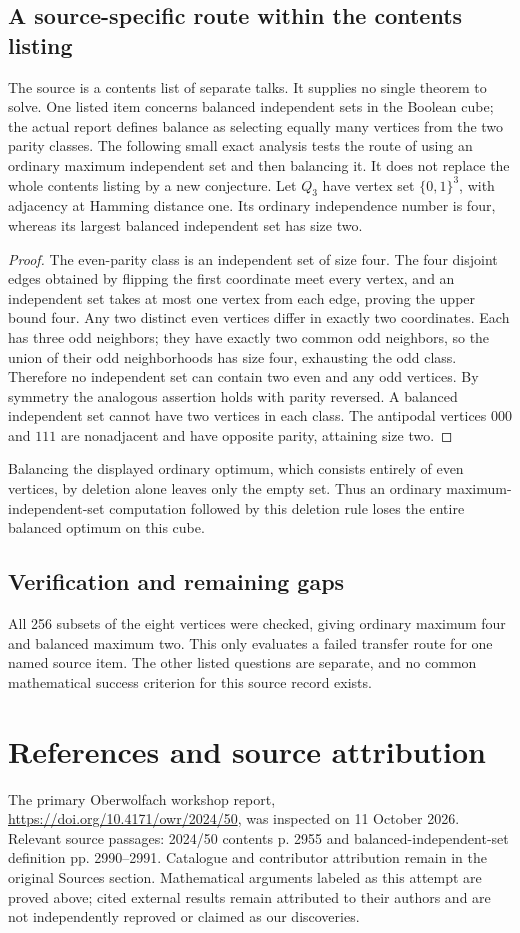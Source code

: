 \documentclass[11pt]{article}
\begin{document}
\subsection{A source-specific route within the contents listing}
The source is a contents list of separate talks. It supplies no single theorem to solve. One listed item concerns balanced independent sets in the Boolean cube; the actual report defines balance as selecting equally many vertices from the two parity classes. The following small exact analysis tests the route of using an ordinary maximum independent set and then balancing it. It does not replace the whole contents listing by a new conjecture.
Let $Q_3$ have vertex set $\{0,1\}^3$, with adjacency at Hamming distance one. Its ordinary independence number is four, whereas its largest balanced independent set has size two.
\begin{proof}
The even-parity class is an independent set of size four. The four disjoint edges obtained by flipping the first coordinate meet every vertex, and an independent set takes at most one vertex from each edge, proving the upper bound four. Any two distinct even vertices differ in exactly two coordinates. Each has three odd neighbors; they have exactly two common odd neighbors, so the union of their odd neighborhoods has size four, exhausting the odd class. Therefore no independent set can contain two even and any odd vertices. By symmetry the analogous assertion holds with parity reversed. A balanced independent set cannot have two vertices in each class. The antipodal vertices $000$ and $111$ are nonadjacent and have opposite parity, attaining size two.
\end{proof}
Balancing the displayed ordinary optimum, which consists entirely of even vertices, by deletion alone leaves only the empty set. Thus an ordinary maximum-independent-set computation followed by this deletion rule loses the entire balanced optimum on this cube.
\subsection{Verification and remaining gaps}
All 256 subsets of the eight vertices were checked, giving ordinary maximum four and balanced maximum two. This only evaluates a failed transfer route for one named source item. The other listed questions are separate, and no common mathematical success criterion for this source record exists.

\section{References and source attribution}
The primary Oberwolfach workshop report, \url{https://doi.org/10.4171/owr/2024/50}, was inspected on 11 October 2026. Relevant source passages: 2024/50 contents p. 2955 and balanced-independent-set definition pp. 2990--2991. Catalogue and contributor attribution remain in the original Sources section. Mathematical arguments labeled as this attempt are proved above; cited external results remain attributed to their authors and are not independently reproved or claimed as our discoveries.
\end{document}
